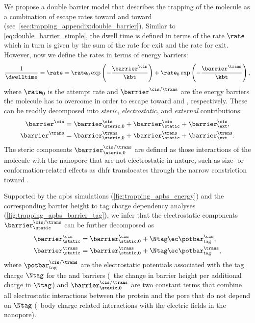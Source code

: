 We propose a double barrier model that describes the trapping of the molecule as a combination of escape rates
toward \cisi{} and toward \transi{} (see~\cref{sec:trapping_appendix:double_barrier}). Similar to
\cref{eq:double_barrier_simple}, the dwell time is defined in terms of the rate $\rate$ which in turn is given
by the sum of the rate for \cisi{} exit and the rate for \transi{} exit. However, now we define the rates in
terms of energy barriers:
%
\begin{align}\label{eq:double_barrier}
    \frac{1}{\dwelltime} = \rate =
        \rate_0 \exp \left( - \dfrac{\barrier^{\cis}}{\kbt} \right)
        + \rate_0 \exp \left( - \dfrac{\barrier^{\trans}}{\kbt} \right),
\end{align}
%
where $\rate_0$ is the attempt rate and $\barrier^{\cis/\trans}$ are the energy barriers the molecule has to
overcome in order to escape toward \cisi{} and \transi{}, respectively. These can be readily decomposed into
\emph{steric}, \emph{electrostatic}, and \emph{external} contributions:
%
\begin{subequations}\label{eq:decomposition}
\begin{align}
  \barrier^{\cis} ={}&
    \barrier^{\cis}_{\steric,0}
    + \barrier^{\cis}_\static
    + \barrier^{\cis}_\ext, \\
  \barrier^{\trans} ={}&
    \barrier^{\trans}_{\steric,0}
    + \barrier^{\trans}_\static
    + \barrier^{\trans}_\ext.
\end{align}
\end{subequations}
%
The steric components $\barrier^{\cis/\trans}_{\steric,0}$ are defined as those interactions of the molecule
with the nanopore that are not electrostatic in nature, such as size- or conformation-related effects as
\gls{dhfr} translocates through the narrow constriction toward \transi{}.

Supported by the \gls{apbs} simulations (\cref{fig:trapping_apbs_energy}) and the corresponding barrier
height to tag charge dependency analyses (\cref{fig:trapping_apbs_barrier_tag}), we infer that the
electrostatic components $\barrier^{\cis/\trans}_{\static}$ can be further decomposed as
%
\begin{subequations}\label{eq:static-barrier}
\begin{align}
	\barrier^{\cis}_\static ={}&
			\barrier^{\cis}_{\static,0}
			+ \Ntag \ec \potbar_{\rm{tag}}^{\cis},\\
	\barrier^{\trans}_\static ={}&
			\barrier^{\trans}_{\static,0}
			+ \Ntag \ec \potbar_{\rm{tag}}^{\trans},
\end{align}
\end{subequations}
%
where $\potbar_{\rm{tag}}^{\cis/\trans}$ are the electrostatic potentials associated with the tag charge
$\Ntag$ for the \cisi{} and \transi{} barriers (\ie~the change in barrier height per additional charge in
$\Ntag$) and $\barrier^{\cis/\trans}_{\static,0}$ are two constant terms that combine all electrostatic
interactions between the protein and the pore that do not depend on $\Ntag$ (\eg~body charge related
interactions with the electric fields in the nanopore).


